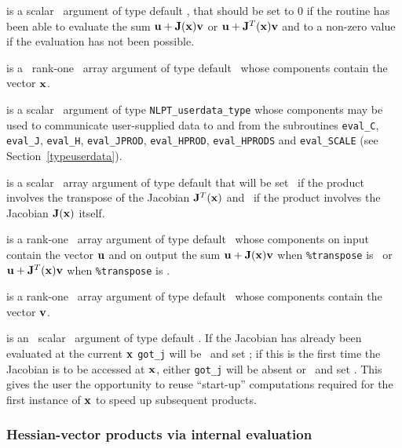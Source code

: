 \documentclass{galahad}
\begin{document}
\begin{description}
 is a scalar \intentout\ argument of type default \integer,
that should be set to 0 if the routine has been able to evaluate the
sum ${\mathbf{u}} + {\mathbf{J}}({\mathbf{x}}) {\mathbf{v}}$ or ${\mathbf{u}} + {\mathbf{J}}^T({\mathbf{x}}){\mathbf{v}}$
and to a non-zero value if the evaluation has not been possible.

 is a \ rank-one \intentin\ array argument of type
default \realdp\ whose components contain the vector ${\mathbf{x}}$.

 is a scalar \intentinout\ argument of type
{\tt NLPT\_userdata\_type} whose components may be used
to communicate user-supplied data to and from the subroutines
{\tt eval\_C}, {\tt eval\_J}, {\tt eval\_H}, {\tt eval\_JPROD},
{\tt eval\_HPROD}, {\tt eval\_HPRODS} and {\tt eval\_SCALE}
(see Section~\ref{typeuserdata}).

 is a scalar \intentin\ array argument of type
default that will be set \true\ if the product involves the transpose
of the Jacobian ${\mathbf{J}}^T({\mathbf{x}})$ and \false\ if the product involves
the Jacobian ${\mathbf{J}}({\mathbf{x}})$ itself.

 is a rank-one \intentinout\ array argument of type default \realdp\
whose components on input contain the vector ${\mathbf{u}}$ and on output the
sum ${\mathbf{u}} + {\mathbf{J}}({\mathbf{x}}) {\mathbf{v}}$ when {\tt \%transpose} is \false\ or
${\mathbf{u}} + {\mathbf{J}}^T({\mathbf{x}}) {\mathbf{v}}$ when {\tt \%transpose} is \true.

 is a rank-one \intentin\ array argument of type default \realdp\
whose components contain the vector ${\mathbf{v}}$.

 is an \optional\ scalar \intentin\ argument of type default
\logical. If the Jacobian has already been evaluated at the current ${\mathbf{x}}$
{\tt got\_j} will be \present\ and set \true; if this is the first time
the Jacobian is to be accessed at ${\mathbf{x}}$, either {\tt got\_j} will be absent
or \present\ and set \false. This gives the user the opportunity
to reuse ``start-up'' computations required for the first instance of
${\mathbf{x}}$ to speed up subsequent products.

\end{description}



\subsubsection{Hessian-vector products via internal evaluation\label{hvfv}}
\end{document}
